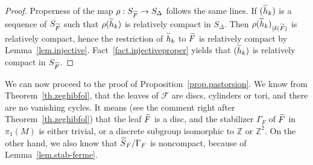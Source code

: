 \documentclass[11pt]{article}
\theoremstyle{definition}
\numberwithin{equation}{section}
\numberwithin{figure}{section}
\numberwithin{table}{section}
\newcommand{\calf}{\mathcal{F}}
\newcommand{\tF}{\tilde{{F}}}
\newcommand{\tth}{\tilde{h}}
\newcommand*\ZZ{\mathbb{Z}}
\let\oldtilde\tilde
\renewcommand*\tilde[1]{\mathchoice{\widetilde{#1}}{\widetilde{#1}}{\widetilde{#1}}{\oldtilde{#1}}}
\begin{document}
\begin{proof}
Properness of the map $\rho:S_{\tF} \to S_{\Delta}$ follows the same lines. If $(\tth_k)$ is a sequence of $S_{\tF}$ such that $\rho(\tth_k)$ is relatively compact in $S_{\Delta}$. Then $\rho(\tth_k)_{|\delta(\tF)}$ is relatively compact, hence the restriction of ${\tth_k}$ to $\tF$ is relatively compact by Lemma~\ref{lem.injective}. Fact~\ref{fact.injectiveproper} yields that $(\tth_k)$ is relatively compact in $S_{\tF}$.
\end{proof}

We can now proceed to the proof of Proposition~\ref{prop.pastorsion}. We know from Theorem~\ref{th.zeghibfol}, that the leaves of $\calf$ are discs, cylinders or tori, and there are no vanishing cycles. It means (see the comment right after Theorem~\ref{th.zeghibfol}) that the leaf $\tF$ is a disc, and the stabilizer $\Gamma_F$ of $\tF $ in $\pi_1(M)$ is either trivial, or a discrete subgroup isomorphic to $\ZZ$ or $\ZZ^2$. On the other hand, we also know that $\tilde{S}_F/\Gamma_F$ is noncompact, because of Lemma~\ref{lem.stab-ferme}.
\end{document}

